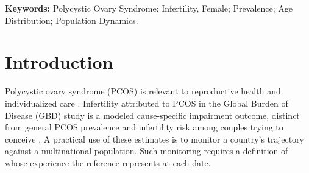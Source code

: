 \documentclass[11pt,a4paper]{article}
\begin{document}
\begin{abstract}
\noindent\textbf{LIMITATIONS, REASONS FOR CAUTION:} These empirical quantities are conditional on GBD model point estimates and rounded published age weights. The uncertainty of component magnitudes and near-zero contrast signs remains unquantified. Scenario ranges are not uncertainty intervals. The 58.5\% ratio uses a signed net denominator with cancellation, rather than a fraction of women or disease. The G20 reference is economically selected and does not represent a clinical control group or the world.

\noindent\textbf{WIDER IMPLICATIONS OF THE FINDINGS:} Researchers monitoring national reproductive-health estimates against pooled international populations should state the comparator weights and report absolute rate and composition components. The mathematical persistence of within-age country composition after age standardization is distinct from its estimated magnitude in these data. Benchmark-dependent contrasts do not establish improved care, causal effects or individual infertility risk.

\noindent\textbf{FUNDING:} XX: verified funding sources and funder roles to be completed by the authors at submission.

\noindent\textbf{DISCLOSURES:} XX: author-specific disclosures to be completed at submission.

\noindent\textbf{TRIAL REGISTRATION NUMBER:} Not applicable; this is a secondary analysis of aggregate estimates, not a clinical trial.
\end{abstract}
\endgroup

\textbf{Keywords:} Polycystic Ovary Syndrome; Infertility, Female; Prevalence; Age Distribution; Population Dynamics.

\section{Introduction}
Polycystic ovary syndrome (PCOS) is relevant to reproductive health and individualized care \citep{pcos}. Infertility attributed to PCOS in the Global Burden of Disease (GBD) study is a modeled cause-specific impairment outcome, distinct from general PCOS prevalence and infertility risk among couples trying to conceive \citep{gbd}. A practical use of these estimates is to monitor a country's trajectory against a multinational population. Such monitoring requires a definition of whose experience the reference represents at each date.
\end{document}
